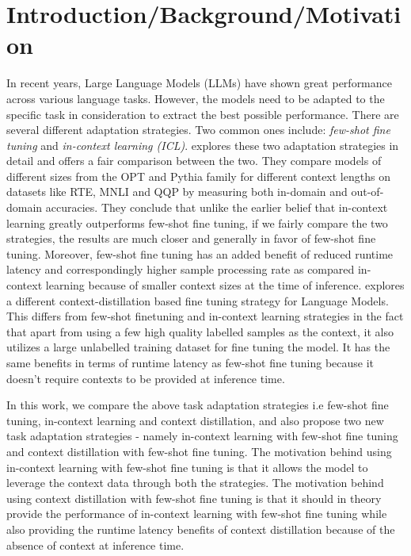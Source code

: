 \documentclass[10pt,twocolumn,letterpaper]{article}
\begin{document}
\section{Introduction/Background/Motivation}
In recent years, Large Language Models (LLMs) have shown great performance across various language tasks. However, the models need to be adapted to the specific task in consideration to extract the best possible performance. There are several different adaptation strategies. Two common ones include: \textit{few-shot fine tuning} and \textit{in-context learning (ICL)}. \cite {mosbach2023fewshot} explores these two adaptation strategies in detail and offers a fair comparison between the two. They compare models of different sizes from the OPT and Pythia family for different context lengths on datasets like RTE, MNLI and QQP by measuring both in-domain and out-of-domain accuracies. They conclude that unlike the earlier belief that in-context learning greatly outperforms few-shot fine tuning, if we fairly compare the two strategies, the results are much closer and generally in favor of few-shot fine tuning. Moreover, few-shot fine tuning has an added benefit of reduced runtime latency and correspondingly higher sample processing rate as compared in-context learning because of smaller context sizes at the time of inference. \cite{askell2021general} explores a different context-distillation based fine tuning strategy for Language Models. This differs from few-shot finetuning and in-context learning strategies in the fact that apart from using a few high quality labelled samples as the context, it also utilizes a large unlabelled training dataset for fine tuning the model. It has the same benefits in terms of runtime latency as few-shot fine tuning because it doesn't require contexts to be provided at inference time.

In this work, we compare the above task adaptation strategies i.e few-shot fine tuning, in-context learning and context distillation, and also propose two new task adaptation strategies - namely in-context learning with few-shot fine tuning and context distillation with few-shot fine tuning. The motivation behind using in-context learning with few-shot fine tuning is that it allows the model to leverage the context data through both the strategies. The motivation behind using context distillation with few-shot fine tuning is that it should in theory provide the performance of in-context learning with few-shot fine tuning while also providing the runtime latency benefits of context distillation because of the absence of context at inference time. 
\end{document}
